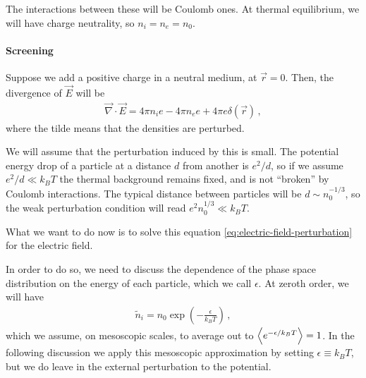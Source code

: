 \documentclass[main.tex]{subfiles}
\begin{document}
The interactions between these will be Coulomb ones. 
At thermal equilibrium, we will have charge neutrality, so \(n_i = n_e = n_0\). 

\paragraph{Screening}

Suppose we add a positive charge in a neutral medium, at \(\vec{r} = 0\). 
Then, the divergence of \(\vec{E}\) will be 
%
\begin{align} \label{eq:electric-field-perturbation}
\vec{\nabla} \cdot \vec{E} = 4 \pi n_i e - 4 \pi n_e e + 4 \pi e \delta (\vec{r})
\,,
\end{align}
%
where the tilde means that the densities are perturbed. 

We will assume that the perturbation induced by this is small. The potential energy drop of a particle at a distance \(d\) from another is \(e^2 / d\), so if we assume \(e^2 / d \ll k_B T\) the thermal background remains fixed, and is not ``broken'' by Coulomb interactions. 
The typical distance between particles will be \(d \sim n_0^{-1/3}\), so the weak perturbation condition will read \(e^2 n_0^{1/3} \ll k_B T\). 

What we want to do now is to solve this equation \eqref{eq:electric-field-perturbation} for the electric field.

In order to do so, we need to discuss the dependence of the phase space distribution on the energy of each particle, which we call \(\epsilon \). 
At zeroth order, we will have 
%
\begin{align}
\widetilde{n}_i = n_0 \exp(- \frac{\epsilon}{k_B T})
\,,
\end{align}
%
which we assume, on mesoscopic scales, to average out to \(\expval{e^{- \epsilon / k_B T}} = 1\).
In the following discussion we apply this mesoscopic approximation by setting \(\epsilon \equiv k_B T\), but we do leave in the external perturbation to the potential. 
\end{document}
